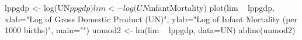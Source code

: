 \begin{Schunk}
\begin{Sinput}
 lppgdp <- log(UN$ppgdp)
 lim <- log(UN$infantMortality)
 plot(lim ~ lppgdp, xlab="Log of Gross Domestic Product (UN)", ylab="Log of Infant Mortality (per 1000 births)", main="")
 unmod2 <- lm(lim ~ lppgdp, data=UN)
 abline(unmod2)
\end{Sinput}
\end{Schunk}
